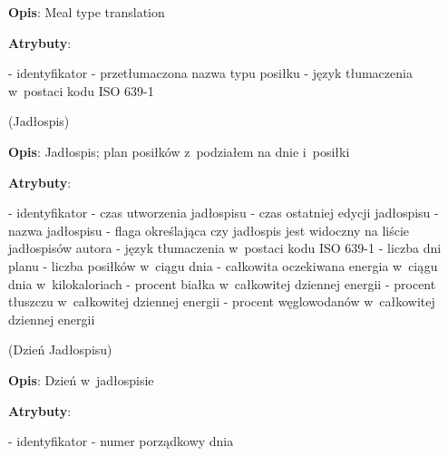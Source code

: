 \begin{enumerate}[label={\textbf{KAT/\protect\threedigits{\theenumi}}}, wide, labelwidth=!, labelindent=0pt, labelsep=0pt, series=reqs]
    \textbf{Opis}: Meal type translation
    \par
    \textbf{Atrybuty}:
    \begin{itemize}[series=atr, wide, align=left, leftmargin=190pt]
        \label{kat:MealTypeTranslation:id}- identyfikator
        \label{kat:MealTypeTranslation:translation}- przetłumaczona nazwa typu posiłku
        \label{kat:MealTypeTranslation:language}- język tłumaczenia w~postaci kodu ISO 639-1
    \end{itemize}


    \label{kat:MealPlan} (Jadłospis)

    \textbf{Opis}: Jadłospis; plan posiłków z~podziałem na dnie i~posiłki
    \par
    \textbf{Atrybuty}:
    \begin{itemize}[series=atr, wide, align=left, leftmargin=190pt]
        \label{kat:MealPlan:id}- identyfikator
        \label{kat:MealPlan:creationTimestamp}- czas utworzenia jadłospisu
        \label{kat:MealPlan:editTimestamp}- czas ostatniej edycji jadłospisu
        \label{kat:MealPlan:name}- nazwa jadłospisu
        \label{kat:MealPlan:isVisible}- flaga określająca czy jadłospis jest widoczny na liście jadłospisów autora
        \label{kat:MealPlan:language}- język tłumaczenia w~postaci kodu ISO 639-1
        \label{kat:MealPlan:numberOfDays}- liczba dni planu
        \label{kat:MealPlan:numberOfMealsPerDay}- liczba posiłków w~ciągu dnia
        \label{kat:MealPlan:totalDailyEnergy}- całkowita oczekiwana energia w~ciągu dnia w~kilokaloriach
        \label{kat:MealPlan:percentOfProtein}- procent białka w~całkowitej dziennej energii
        \label{kat:MealPlan:percentOfFat}- procent tłuszczu w~całkowitej dziennej energii
        \label{kat:MealPlan:percentOfCarbohydrates}- procent węglowodanów w~całkowitej dziennej energii
    \end{itemize}

    \label{kat:MealPlanDay} (Dzień Jadłospisu)

    \textbf{Opis}: Dzień w~jadłospisie
    \par
    \textbf{Atrybuty}:
    \begin{itemize}[series=atr, wide, align=left, leftmargin=190pt]
        \label{kat:MealPlanDay:id}- identyfikator
        \label{kat:MealPlanDay:ordinalNumber}- numer porządkowy dnia
    \end{itemize}


\end{enumerate}
